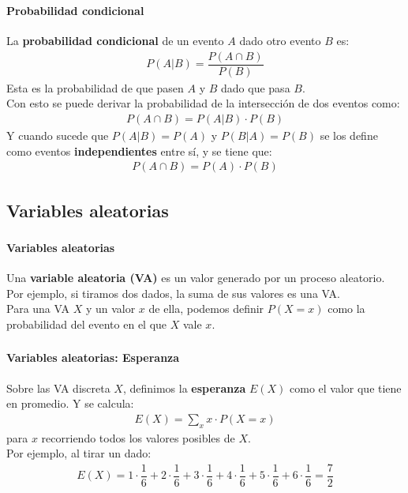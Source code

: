 \documentclass[../main.tex]{subfiles}
\begin{document}
\begin{frame}
  \frametitle{\SECTIONA}
  \framesubtitle{Probabilidad condicional}

  La \textbf{probabilidad condicional} de un evento \(A\) dado otro evento \(B\) es:
  \begin{gather*}
    P(A | B) = \dfrac{P(A \cap B)}{P(B)}
  \end{gather*}
  Esta es la probabilidad de que pasen \(A\) y \(B\) dado que pasa \(B\). \pause \\
  Con esto se puede derivar la probabilidad de la intersección de dos eventos como:
  \begin{gather*}
    P(A \cap B) = P(A | B) \cdot P(B)
  \end{gather*} \pause
  Y cuando sucede que \(P(A|B) = P(A)\) y \(P(B|A) = P(B)\) se los define como eventos \textbf{independientes} entre sí, y se tiene que:
  \begin{gather*}
    P(A \cap B) = P(A) \cdot P(B)
  \end{gather*}
\end{frame}

\subsection{Variables aleatorias}

\begin{frame}
  \frametitle{\SECTIONA}
  \framesubtitle{Variables aleatorias}

  Una \textbf{variable aleatoria (VA)} es un valor generado por un proceso aleatorio. Por ejemplo, si tiramos dos dados, la suma de sus valores es una VA. \pause \\
  Para una VA \(X\) y un valor \(x\) de ella, podemos definir \(P(X = x)\) como la probabilidad del evento en el que \(X\) vale \(x\).
\end{frame}


\begin{frame}
  \frametitle{\SECTIONA}
  \framesubtitle{Variables aleatorias: Esperanza}

  Sobre las VA discreta \(X\), definimos la \textbf{esperanza} \(E(X)\) como el valor que tiene en promedio. Y se calcula:
  \begin{gather*}
    E(X) = \sum_{x}x \cdot P(X = x)
  \end{gather*}
  para \(x\) recorriendo todos los valores posibles de \(X\). \pause \\
  Por ejemplo, al tirar un dado:
  \begin{gather*}
    E(X) = 1 \cdot \dfrac{1}{6} + 2 \cdot \dfrac{1}{6} + 3 \cdot \dfrac{1}{6} + 4 \cdot \dfrac{1}{6} + 5 \cdot \dfrac{1}{6} + 6 \cdot \dfrac{1}{6} = \dfrac{7}{2}
  \end{gather*}
\end{frame}
\end{document}
